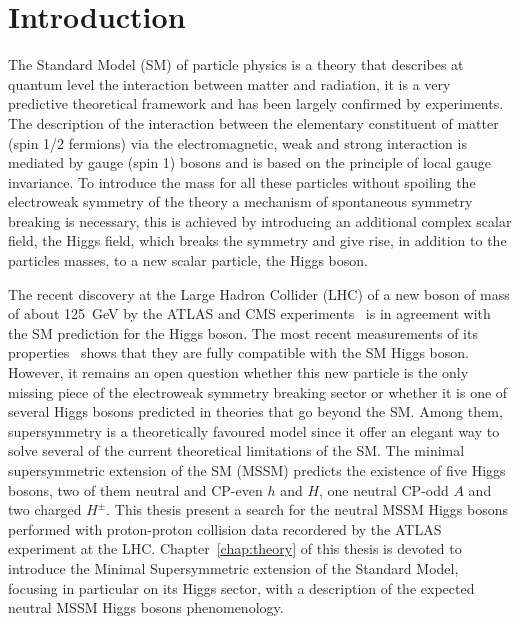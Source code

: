 \chapter{Introduction}

 
The Standard Model (SM) of particle physics is a theory that describes at quantum level the interaction 
between matter and radiation, it is a very predictive  theoretical framework and 
has been largely confirmed by experiments.  The description of the interaction
between the elementary constituent of matter (spin 1/2 fermions) via the electromagnetic, weak and strong interaction
is mediated by gauge (spin 1) bosons and is based on the principle of local gauge invariance.
To introduce the mass for all these  particles without spoiling the electroweak symmetry of the theory
a mechanism of spontaneous symmetry breaking is necessary, this is achieved by introducing 
an additional complex scalar field, the Higgs field, which breaks the symmetry and
give rise, in addition to the particles masses, to a new scalar particle, the Higgs boson.

The recent discovery at the  Large Hadron Collider (LHC) of a new boson of mass
of about 125~GeV by the ATLAS and CMS experiments~\cite{AHiggsO,CHiggsO} is in agreement with the 
SM prediction for the Higgs boson.
The most recent measurements  of its properties~\cite{ASpin0,ACouplings,CFermions,CWidth} shows 
that they are fully compatible with the SM Higgs boson. However, it remains an open question
whether this new particle is the only missing piece of the electroweak symmetry breaking
sector or whether it is one of several Higgs bosons predicted in  theories 
that go beyond the SM.  Among  them, supersymmetry is a theoretically favoured model
since it offer an elegant way to solve several of the current theoretical limitations of the SM.
The minimal supersymmetric extension of the SM (MSSM) predicts the existence
of five Higgs bosons, two of them neutral and CP-even $h$ and $H$, one neutral CP-odd $A$ and two charged $H^{\pm}$.
This thesis present a search for the neutral MSSM Higgs bosons performed with proton-proton collision data recordered by the ATLAS
experiment at the LHC. Chapter~\ref{chap:theory} of this thesis 
is devoted to introduce the Minimal Supersymmetric extension of the Standard Model, focusing 
in particular on its Higgs sector, with a description of the expected neutral MSSM Higgs bosons
phenomenology.


